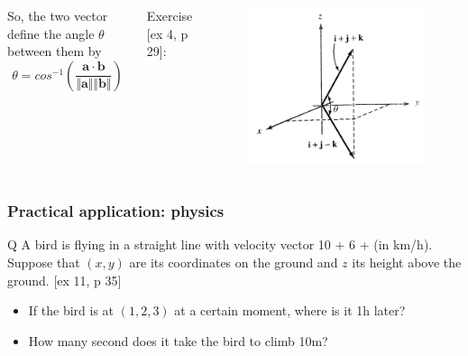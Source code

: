 \documentclass{beamer}
\begin{document}
\begin{frame}
\begin{columns}[c]
So, the two vector define the angle $\theta$ between them by
$$ \theta = cos^{-1}\left(\frac{\mathbf{a} \cdot \mathbf{b}}{\Vert \mathbf{a}\Vert  \Vert \mathbf{b} \Vert} \right)$$

Exercise [ex 4, p 29]:
\begin{figure}[htbp]
\begin{center}
 \includegraphics[width=\textwidth]{angle_vector.png}
\caption{}
\end{center}
\end{figure}
\end{columns}
\end{frame}


\begin{frame}
\frametitle{Practical application: physics}
\begin{block}{Q}
A bird is flying in a straight line with velocity vector 10  +  6  +    (in km/h). Suppose that $\left(x,y\right)$ are its coordinates on the ground and $z$ its height above the ground. [ex 11, p 35]
\begin{itemize}
\item If the bird is at $(1,2,3)$ at a certain moment, where is it 1h later?
\item How many second does it take the bird to climb 10m?
\end{itemize}

\end{block}  
\end{frame}
\end{document}
